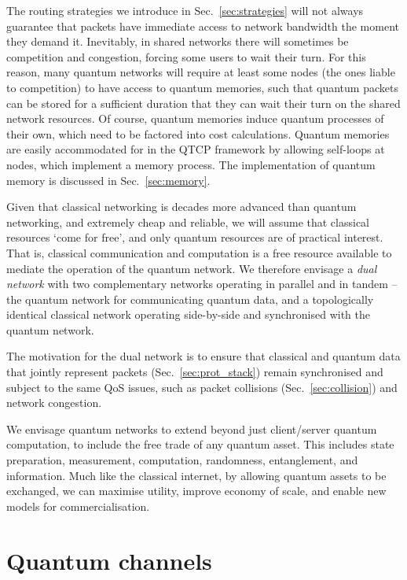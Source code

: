 \documentclass[aps,rmp,twocolumn,amsmath,amssymb,nofootinbib,superscriptaddress,longbibliography,floatfix]{revtex4-1}
\begin{document}
The routing strategies we introduce in Sec.~\ref{sec:strategies} will not always guarantee that packets have immediate access to network bandwidth the moment they demand it. Inevitably, in shared networks there will sometimes be competition and congestion, forcing some users to wait their turn. For this reason, many quantum networks will require at least some nodes (the ones liable to competition) to have access to quantum memories, such that quantum packets can be stored for a sufficient duration that they can wait their turn on the shared network resources. Of course, quantum memories induce quantum processes of their own, which need to be factored into cost calculations. Quantum memories are easily accommodated for in the QTCP framework by allowing self-loops at nodes, which implement a memory process. The implementation of quantum memory is discussed in Sec.~\ref{sec:memory}.

Given that classical networking is decades more advanced than quantum networking, and extremely cheap and reliable, we will assume that classical resources `come for free', and only quantum resources are of practical interest. That is, classical communication and computation is a free resource available to mediate the operation of the quantum network. We therefore envisage a \emph{dual network} with two complementary networks operating in parallel and in tandem -- the quantum network for communicating quantum data, and a topologically identical classical network operating side-by-side and synchronised with the quantum network.

The motivation for the dual network is to ensure that classical and quantum data that jointly represent packets (Sec.~\ref{sec:prot_stack}) remain synchronised and subject to the same QoS issues, such as packet collisions (Sec.~\ref{sec:collision}) and network congestion.

We envisage quantum networks to extend beyond just client/server quantum computation, to include the free trade of any quantum asset. This includes state preparation, measurement, computation, randomness, entanglement, and information. Much like the classical internet, by allowing quantum assets to be exchanged, we can maximise utility, improve economy of scale, and enable new models for commercialisation.

%
%

\section{Quantum channels} \label{sec:quant_chan}
\end{document}
